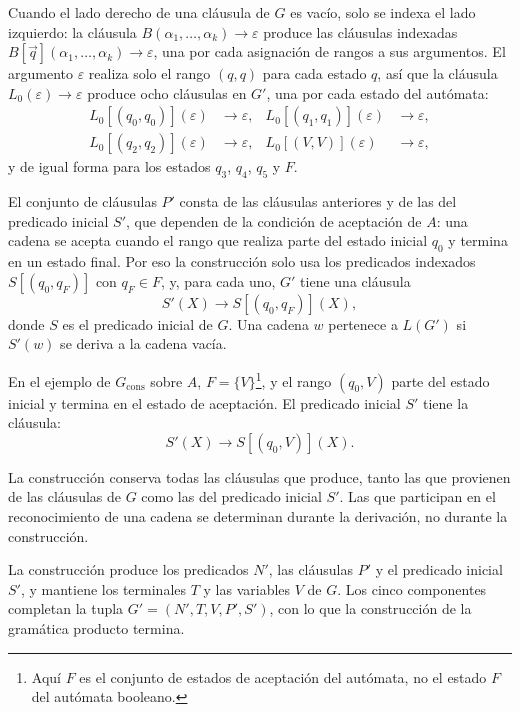 \documentclass{report}
\theoremstyle{definition}
\theoremstyle{plain}
\begin{document}
Cuando el lado derecho de una cláusula de $G$ es vacío, solo se indexa el lado izquierdo: la cláusula $B(\alpha_1, \ldots, \alpha_k) \to \varepsilon$
produce las cláusulas indexadas $B[\vec q](\alpha_1, \ldots, \alpha_k) \to
\varepsilon$, una por cada asignación de rangos a sus argumentos. El
argumento $\varepsilon$ realiza solo el rango $(q, q)$ para cada estado
$q$, así que la cláusula $L_0(\varepsilon) \to \varepsilon$ produce ocho
cláusulas en $G'$, una por cada estado del autómata:
\begin{align*}
  L_0[(q_0, q_0)](\varepsilon) &\to \varepsilon, &
  L_0[(q_1, q_1)](\varepsilon) &\to \varepsilon, \\
  L_0[(q_2, q_2)](\varepsilon) &\to \varepsilon, &
  L_0[(V, V)](\varepsilon) &\to \varepsilon,
\end{align*}
y de igual forma para los estados $q_3$, $q_4$, $q_5$ y $F$.

El conjunto de cláusulas $P'$ consta de las cláusulas anteriores y de
las del predicado inicial $S'$, que dependen de la condición de
aceptación de $A$: una cadena se acepta cuando el rango que realiza
parte del estado inicial $q_0$ y termina en un estado final. Por eso la
construcción solo usa los predicados indexados $S[(q_0, q_F)]$ con
$q_F \in F$, y, para cada uno, $G'$ tiene una cláusula
\[
  S'(X) \to S[(q_0, q_F)](X),
\]
donde $S$ es el predicado inicial de $G$. Una cadena $w$ pertenece a
$L(G')$ si $S'(w)$ se deriva a la cadena vacía.

En el ejemplo de $G_{\mathrm{cons}}$ sobre $A$, $F = \{V\}$\footnote{Aquí
$F$ es el conjunto de estados de aceptación del autómata, no el estado
$F$ del autómata booleano.}, y el rango
$(q_0, V)$ parte del estado inicial y termina en el estado de
aceptación. El predicado inicial $S'$ tiene la cláusula:
\[
  S'(X) \to S[(q_0, V)](X).
\]

La construcción conserva todas las cláusulas que produce, tanto las
que provienen de las cláusulas de $G$ como las del predicado inicial
$S'$. Las que participan en el reconocimiento de una cadena se
determinan durante la derivación, no durante la construcción.

La construcción produce los predicados $N'$, las cláusulas $P'$ y el
predicado inicial $S'$, y mantiene los terminales $T$ y las variables
$V$ de $G$. Los cinco componentes completan la tupla
$G' = (N', T, V, P', S')$, con lo que la construcción de la gramática
producto termina.
\end{document}
